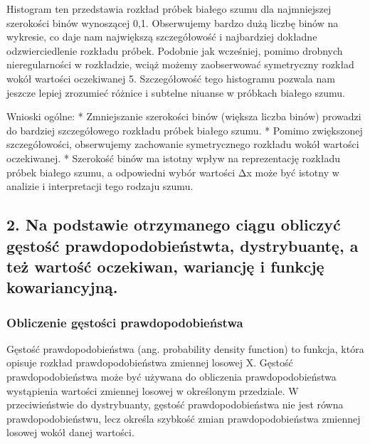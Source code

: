 \documentclass[11pt]{article}
\begin{document}
    Histogram ten przedstawia rozkład próbek białego szumu dla najmniejszej
szerokości binów wynoszącej 0,1. Obserwujemy bardzo dużą liczbę binów na
wykresie, co daje nam największą szczegółowość i najbardziej dokładne
odzwierciedlenie rozkładu próbek. Podobnie jak wcześniej, pomimo
drobnych nieregularności w rozkładzie, wciąż możemy zaobserwować
symetryczny rozkład wokół wartości oczekiwanej 5. Szczegółowość tego
histogramu pozwala nam jeszcze lepiej zrozumieć różnice i subtelne
niuanse w próbkach białego szumu.

Wnioski ogólne: * Zmniejszanie szerokości binów (większa liczba binów)
prowadzi do bardziej szczegółowego rozkładu próbek białego szumu. *
Pomimo zwiększonej szczegółowości, obserwujemy zachowanie symetrycznego
rozkładu wokół wartości oczekiwanej. * Szerokość binów ma istotny wpływ
na reprezentację rozkładu próbek białego szumu, a odpowiedni wybór
wartości Δx może być istotny w analizie i interpretacji tego rodzaju
szumu.

    \hypertarget{na-podstawie-otrzymanego-ciux105gu-obliczyux107-gux119stoux15bux107-prawdopodobieux144stwta-dystrybuantux119-a-teux17c-wartoux15bux107-oczekiwan-wariancjux119-i-funkcjux119-kowariancyjnux105.}{%
\subsection{2. Na podstawie otrzymanego ciągu obliczyć gęstość
prawdopodobieństwta, dystrybuantę, a też wartość oczekiwan, wariancję i
funkcję
kowariancyjną.}\label{na-podstawie-otrzymanego-ciux105gu-obliczyux107-gux119stoux15bux107-prawdopodobieux144stwta-dystrybuantux119-a-teux17c-wartoux15bux107-oczekiwan-wariancjux119-i-funkcjux119-kowariancyjnux105.}}

    \hypertarget{obliczenie-gux119stoux15bci-prawdopodobieux144stwa}{%
\subsubsection{Obliczenie gęstości
prawdopodobieństwa}\label{obliczenie-gux119stoux15bci-prawdopodobieux144stwa}}

Gęstość prawdopodobieństwa (ang. probability density function) to
funkcja, która opisuje rozkład prawdopodobieństwa zmiennej losowej X.
Gęstość prawdopodobieństwa może być używana do obliczenia
prawdopodobieństwa wystąpienia wartości zmiennej losowej w określonym
przedziale. W przeciwieństwie do dystrybuanty, gęstość
prawdopodobieństwa nie jest równa prawdopodobieństwu, lecz określa
szybkość zmian prawdopodobieństwa zmiennej losowej wokół danej wartości.
\end{document}

